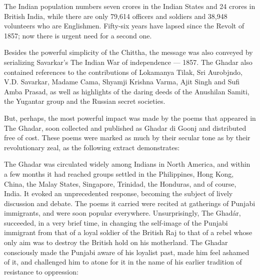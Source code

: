 \begin{center}
The Indian population numbers seven crores in the Indian States and 24 crores in British India, while there are only 79,614 officers and soldiers and 38,948 volunteers who are Englishmen. Fifty-six years have lapsed since the Revolt of 1857; now there is urgent need for a second one.
\end{center}

Besides the powerful simplicity of the Chittha, the message was also conveyed by serializing Savarkar's The Indian War of independence --- 1857. The Ghadar also contained references to the contributions of Lokamanya Tilak, Sri Aurobjndo, V.D. Savarkar, Madame Cama, Shyamji Krishna Varma, Ajit Singh and Sufi Amba Prasad, as well as highlights of the daring deeds of the Anushilan Samiti, the Yugantar group and the Russian secret societies.

But, perhaps, the most powerful impact was made by the poems that appeared in The Ghadar, soon collected and published as Ghadar di Goonj and distributed free of cost. These poems were marked as much by their secular tone as by their revolutionary zeal, as the following extract demonstrates:


The Ghadar was circulated widely among Indians in North America, and within a few months it had reached groups settled in the Philippines, Hong Kong, China, the Malay States, Singapore, Trinidad, the Honduras, and of course, India. It evoked an unprecedented response, becoming the subject of lively discussion and debate. The poems it carried were recited at gatherings of Punjabi immigrants, and were soon popular everywhere. Unsurprisingly, The Ghadár, succeeded, in a very brief time, in changing the self-image of the Punjabi immigrant from that of a loyal soldier of the British Raj to that of a rebel whose only aim was to destroy the British hold on his motherland. The Ghadar consciously made the Punjabi aware of his loyalist past, made him feel ashamed of it, and challenged him to atone for it in the name of his earlier tradition of resistance to oppression:

